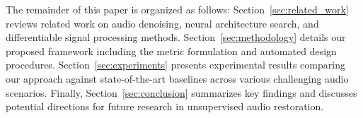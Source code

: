 The remainder of this paper is organized as follows: Section~\ref{sec:related_work} reviews related work on audio denoising, neural architecture search, and differentiable signal processing methods. Section~\ref{sec:methodology} details our proposed framework including the metric formulation and automated design procedures. Section~\ref{sec:experiments} presents experimental results comparing our approach against state-of-the-art baselines across various challenging audio scenarios. Finally, Section~\ref{sec:conclusion} summarizes key findings and discusses potential directions for future research in unsupervised audio restoration.
